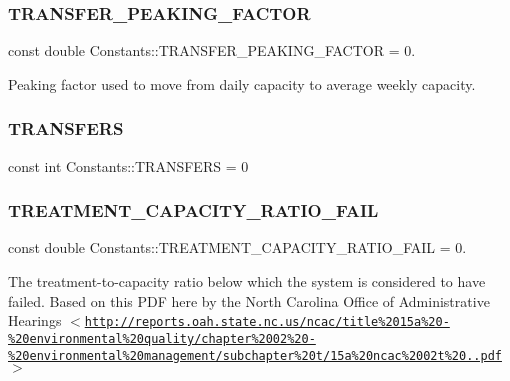 \subsubsection{\texorpdfstring{T\+R\+A\+N\+S\+F\+E\+R\+\_\+\+P\+E\+A\+K\+I\+N\+G\+\_\+\+F\+A\+C\+T\+OR}{TRANSFER\_PEAKING\_FACTOR}}
{\footnotesize\ttfamily const double Constants\+::\+T\+R\+A\+N\+S\+F\+E\+R\+\_\+\+P\+E\+A\+K\+I\+N\+G\+\_\+\+F\+A\+C\+T\+OR = 0.}



Peaking factor used to move from daily capacity to average weekly capacity. 

\mbox{\label{classConstants_a02748ff742cda86e055625ce8ca43133}} 
\subsubsection{\texorpdfstring{T\+R\+A\+N\+S\+F\+E\+RS}{TRANSFERS}}
{\footnotesize\ttfamily const int Constants\+::\+T\+R\+A\+N\+S\+F\+E\+RS = 0}

\mbox{\label{classConstants_a46c9ebb6c42fca2994f2caf1db259896}} 
\subsubsection{\texorpdfstring{T\+R\+E\+A\+T\+M\+E\+N\+T\+\_\+\+C\+A\+P\+A\+C\+I\+T\+Y\+\_\+\+R\+A\+T\+I\+O\+\_\+\+F\+A\+IL}{TREATMENT\_CAPACITY\_RATIO\_FAIL}}
{\footnotesize\ttfamily const double Constants\+::\+T\+R\+E\+A\+T\+M\+E\+N\+T\+\_\+\+C\+A\+P\+A\+C\+I\+T\+Y\+\_\+\+R\+A\+T\+I\+O\+\_\+\+F\+A\+IL = 0.}



The treatment-\/to-\/capacity ratio below which the system is considered to have failed. Based on this P\+DF here by the {\ttfamily North Carolina Office of Administrative Hearings $<$\href{http://reports.oah.state.nc.us/ncac/title%2015a%20-%20environmental%20quality/chapter%2002%20-%20environmental%20management/subchapter%20t/15a%20ncac%2002t%20.0118.pdf}{\tt http\+://reports.\+oah.\+state.\+nc.\+us/ncac/title\%2015a\%20-\/\%20environmental\%20quality/chapter\%2002\%20-\/\%20environmental\%20management/subchapter\%20t/15a\%20ncac\%2002t\%20.\+0118.\+pdf}$>$} 

